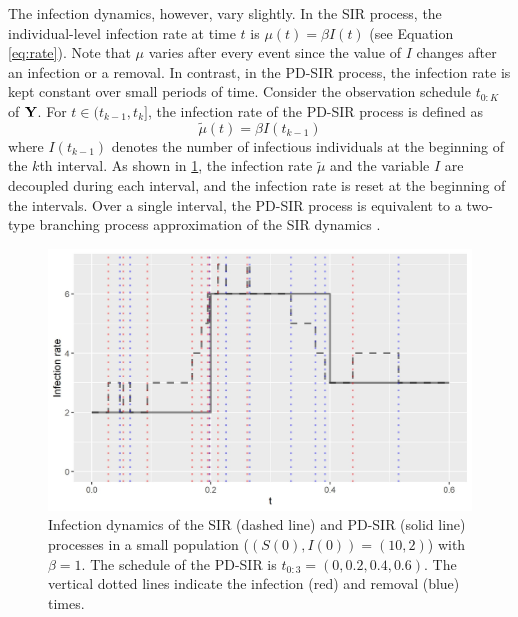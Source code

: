 \documentclass[11pt]{article}
\begin{document}
	The infection dynamics, however, vary slightly.
	In the SIR process, the individual-level infection rate at time $t$ is $\mu(t) = \beta I(t)$ (see Equation \ref{eq:rate}).
	Note that $\mu$ varies after every event since the value of $I$ changes after an infection or a removal.
	In contrast, in the PD-SIR process, the infection rate is kept constant over small periods of time. Consider the observation schedule $t_{0:K}$ of $\mathbf{Y}$. For $t \in (t_{k-1}, t_k]$, the infection rate of the PD-SIR process is defined as
	$$\tilde{\mu}(t) = \beta I(t_{k - 1})$$
	where $I(t_{k-1})$ denotes the number of infectious individuals at the beginning of the $k$th interval. As shown in \ref{fig:mu}, the infection rate $\tilde{\mu}$ and the variable $I$ are decoupled during each interval, and the infection rate is reset at the beginning %
	of the intervals. Over a single interval, the PD-SIR process is equivalent to a two-type branching process approximation of the SIR dynamics \cite{Ho.2018}. 
	
	\begin{figure}
		\centering
		\includegraphics[scale = 0.4]{infection_rate_SIR_PDSIR.jpg}
		\caption{Infection dynamics of the SIR (dashed line) and PD-SIR (solid line) processes in a small population ($(S(0), I(0)) = (10,2)$) with $\beta=1$. The schedule of the PD-SIR is $t_{0:3}=(0, 0.2, 0.4, 0.6)$.
		The vertical dotted lines indicate the infection (red) and removal (blue) times.}
		\label{fig:mu}
	\end{figure}
	
\end{document}
